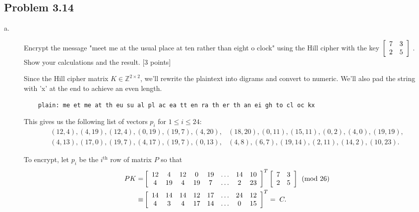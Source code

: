 \documentclass[../hw_sols.tex]{subfiles}
\begin{document}
\newpage



\subsection*{Problem 3.14}
\begin{description}

\item[a.] Encrypt the message "meet me at the usual place at ten rather than eight o clock" using the Hill cipher with the key 
$\left[ \begin{array}{ c c }
	7 & 3 \\ 2 & 5
	\end{array} \right]$
. Show your calculations and the result. [3 points]

\begin{solution}
Since the Hill cipher matrix $K \in \mathbb{Z}^{2 \times 2}$, we'll rewrite the plaintext into digrams and convert to numeric. We'll also pad the string with 'x' at the end to achieve an even length.
	\begin{verbatim}
    plain: me et me at th eu su al pl ac ea tt en ra th er th an ei gh to cl oc kx
	\end{verbatim}
This gives us the following list of vectors $p_i$ for $1 \leq i \leq 24$:
\begin{align*}
	(12,4), (4,19), (12,4), (0,19), (19,7), (4,20),& 
		(18,20), (0,11), (15,11), (0,2), (4,0), (19,19), \\
	(4,13), (17,0), (19,7), (4,17), (19,7), (0,13),& 
		(4,8), (6,7), (19,14), (2,11), (14,2), (10,23).
\end{align*}

To encrypt, let $p_i$ be the $i^{\text{th}}$ row of matrix $P$ so that
\begin{align*}
	PK =& 
	\left[ \begin{array}{ *{8}{c} }
		12 & 4 & 12 & 0 & 19 & \dots & 14 & 10 \\
		4 & 19 & 4 & 19 & 7 & \dots & 2 & 23
	\end{array} \right]^T
	\left[ \begin{array}{ c c }
		7 & 3 \\ 2 & 5
	\end{array}\right] 
		\pmod{26} \\
	\equiv& \left[ \begin{array}{ *{8}{c} }
		14 & 14 & 14 & 12 & 17 & \dots & 24 & 12 \\
		4 & 3 & 4 & 17 & 14 & \dots & 0 & 15
	\end{array}\right]^T 
		= \; C.
\end{align*}


\end{solution}
\end{description}
\end{document}
